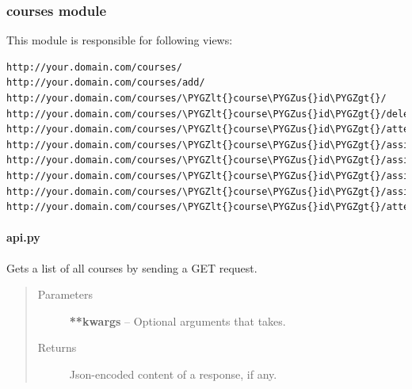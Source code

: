 \documentclass[letterpaper,10pt,english]{sphinxmanual}
\def\PYGZus{\char`\_}
\def\PYGZlt{\char`\<}
\def\PYGZgt{\char`\>}
\begin{document}
\subsubsection{courses module}
\label{web_portal:courses-module}
This module is responsible for following views:

\begin{Verbatim}[commandchars=\\\{\}]
http://your.domain.com/courses/
http://your.domain.com/courses/add/
http://your.domain.com/courses/\PYGZlt{}course\PYGZus{}id\PYGZgt{}/
http://your.domain.com/courses/\PYGZlt{}course\PYGZus{}id\PYGZgt{}/delete/
http://your.domain.com/courses/\PYGZlt{}course\PYGZus{}id\PYGZgt{}/attend/
http://your.domain.com/courses/\PYGZlt{}course\PYGZus{}id\PYGZgt{}/assignments/add/
http://your.domain.com/courses/\PYGZlt{}course\PYGZus{}id\PYGZgt{}/assignments/\PYGZlt{}assignment\PYGZus{}id\PYGZgt{}/
http://your.domain.com/courses/\PYGZlt{}course\PYGZus{}id\PYGZgt{}/assignments/\PYGZlt{}assignment\PYGZus{}id\PYGZgt{}/solutions/
http://your.domain.com/courses/\PYGZlt{}course\PYGZus{}id\PYGZgt{}/assignments/\PYGZlt{}assignment\PYGZus{}id\PYGZgt{}/solutions/\PYGZlt{}solution\PYGZus{}id\PYGZgt{}/
http://your.domain.com/courses/\PYGZlt{}course\PYGZus{}id\PYGZgt{}/attendee/\PYGZlt{}attendee\PYGZus{}id\PYGZgt{}/solutions/
\end{Verbatim}


\paragraph{api.py}
\label{web_portal:api-py}

\begin{fulllineitems}
\label{web_portal:core.courses.api.get_courses}
Gets a list of all courses by sending a GET request.
\begin{quote}\begin{description}
\item[{Parameters}] \leavevmode
\textbf{**kwargs} -- Optional arguments that  takes.

\item[{Returns}] \leavevmode
Json-encoded content of a response, if any.

\end{description}\end{quote}

\end{fulllineitems}
\end{document}
